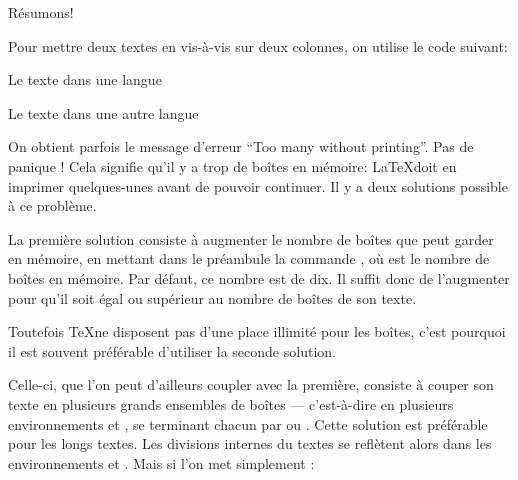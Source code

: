 Résumons!

Pour mettre deux textes en vis-à-vis sur deux colonnes, on utilise le code suivant: 

\begin{latexcode}

\begin{pages}  %
\begin{Leftside} %
 \beginnumbering %
 \pstart %
 
Le texte dans une langue 
 
 \pend
 \endnumbering  %
 \end{Leftside} %
 
 \begin{Rightside}  %
 \beginnumbering
 \pstart
 
 Le texte dans une autre langue
 
 \pend
 \endnumbering
 \end{Rightside} 
 \Pages

  \end{pages} %
\end{latexcode}


On obtient parfois le message d'erreur \enquote{Too many  without printing}. Pas de panique ! Cela signifie qu'il y a trop de boîtes en mémoire: \LaTeX  doit en imprimer quelques-unes avant de pouvoir continuer.  Il y a deux solutions possible à ce problème.

La première solution consiste à  augmenter le nombre de boîtes que  peut garder en mémoire, en mettant dans le préambule la commande , où  est le nombre de boîtes en mémoire. Par défaut, ce nombre est de dix. Il suffit donc de l'augmenter  pour qu'il soit égal ou supérieur au nombre de boîtes de son  texte. 

Toutefois \TeX ne disposent pas d'une place illimité pour les boîtes, c'est pourquoi il est souvent préférable d'utiliser la seconde solution.


Celle-ci, que l'on peut d'ailleurs coupler avec la première, consiste à  couper son texte en plusieurs grands ensembles de boîtes --- c'est-à-dire en plusieurs environnements  et , se terminant chacun par  ou .  Cette solution est préférable pour les longs textes. Les divisions internes du textes se reflètent alors dans les environnements  et .   Mais si l'on met simplement :

